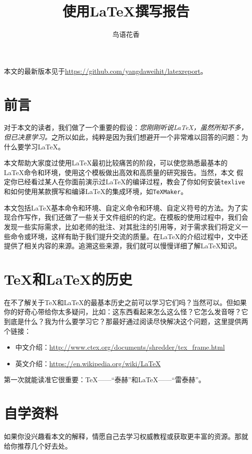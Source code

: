 \documentclass{hitec}
\title{使用\LaTeX{}撰写报告}
\author{鸟语花香}
\begin{document}
\maketitle
%
本文的最新版本见于\url{https://github.com/yangdaweihit/latexreport}。

\tableofcontents
\section{前言}
对于本文的读者，我们做了一个重要的假设：\emph{您刚刚听说\LaTeX{}，虽然所知不多，但已决意学习。}之所以如此，纯粹是因为我们想避开一个非常难以回答的问题：为什么要学习\LaTeX{}。

本文帮助大家度过使用\LaTeX{}最初比较痛苦的阶段，可以使您熟悉最基本的
\LaTeX{}命令和环境，使用这个模板做出高效和高质量的研究报告。当然，本文
假定你已经看过某人在你面前演示过\LaTeX{}的编译过程，教会了你如何安装\texttt{texlive}和如何使用某款撰写和编译\LaTeX{}的集成环境，如\texttt{TeXMaker}。

本文包括\LaTeX{}基本命令和环境、自定义命令和环境、自定义符号的方法。为了实现合作写作，我们还做了一些关于文件组织的约定。在模板的使用过程中，我们会发现一些实际需求，比如老师的批注、对其批注的引用等，对于需求我们将定义一些命令或环境，这样有助于我们提升交流的质量。在\LaTeX{}的介绍过程中，文中还提供了相关内容的来源。追溯这些来源，我们就可以慢慢详细了解\LaTeX{}知识。

\section{\TeX{}和\LaTeX{}的历史}
在不了解关于\TeX{}和\LaTeX{}的最基本历史之前可以学习它们吗？当然可以。但如果你的好奇心带给你太多疑问，比如：这东西看起来怎么这么怪？它怎么发音呀？它到底是什么？我为什么要学习它？那最好通过阅读尽快解决这个问题，这里提供两个链接：

\begin{itemize}
\item 中文介绍：\url{http://www.ctex.org/documents/shredder/tex_frame.html}
\item 英文介绍：\url{https://en.wikipedia.org/wiki/LaTeX}
\end{itemize}

第一次就能读准它很重要：\TeX{}——“泰赫”和\LaTeX{}——“雷泰赫”。

\section{自学资料}
如果你没兴趣看本文的解释，情愿自己去学习权威教程或获取更丰富的资源。那就给你推荐几个好去处。
\end{document}
